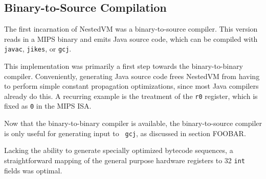 \documentclass{acmconf}
\begin{document}
\subsection{Binary-to-Source Compilation}

The first incarnation of NestedVM was a binary-to-source compiler.
This version reads in a MIPS binary and emits Java source code, which
can be compiled with {\tt javac}, {\tt jikes}, or {\tt gcj}.

This implementation was primarily a first step towards the
binary-to-binary compiler.  Conveniently, generating Java source code
frees NestedVM from having to perform simple constant propagation
optimizations, since most Java compilers already do this.  A recurring
example is the treatment of the {\tt r0} register, which is fixed as
{\tt 0} in the MIPS ISA.

Now that the binary-to-binary compiler is available, the
binary-to-source compiler is only useful for generating input to {\tt
gcj}, as discussed in section FOOBAR.

Lacking the ability to generate specially optimized bytecode
sequences, a straightforward mapping of the general purpose hardware
registers to 32 {\tt int} fields was optimal.
\end{document}
